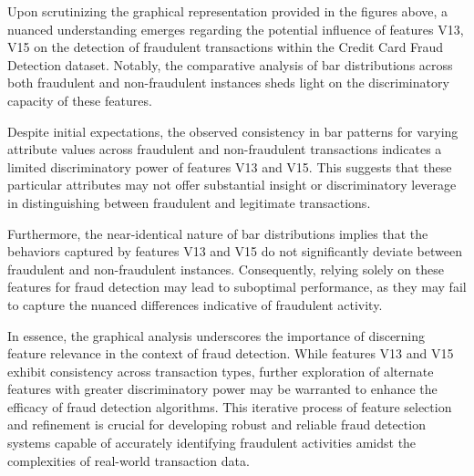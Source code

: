 \documentclass[conference]{IEEEtran}
\begin{document}
Upon scrutinizing the graphical representation provided in the figures above, a nuanced understanding emerges regarding the potential influence of features V13, V15 on the detection of fraudulent transactions within the Credit Card Fraud Detection dataset. Notably, the comparative analysis of bar distributions across both fraudulent and non-fraudulent instances sheds light on the discriminatory capacity of these features.

Despite initial expectations, the observed consistency in bar patterns for varying attribute values across fraudulent and non-fraudulent transactions indicates a limited discriminatory power of features V13 and V15. This suggests that these particular attributes may not offer substantial insight or discriminatory leverage in distinguishing between fraudulent and legitimate transactions.

Furthermore, the near-identical nature of bar distributions implies that the behaviors captured by features V13 and V15 do not significantly deviate between fraudulent and non-fraudulent instances. Consequently, relying solely on these features for fraud detection may lead to suboptimal performance, as they may fail to capture the nuanced differences indicative of fraudulent activity.

In essence, the graphical analysis underscores the importance of discerning feature relevance in the context of fraud detection. While features V13 and V15 exhibit consistency across transaction types, further exploration of alternate features with greater discriminatory power may be warranted to enhance the efficacy of fraud detection algorithms. This iterative process of feature selection and refinement is crucial for developing robust and reliable fraud detection systems capable of accurately identifying fraudulent activities amidst the complexities of real-world transaction data.
\end{document}
